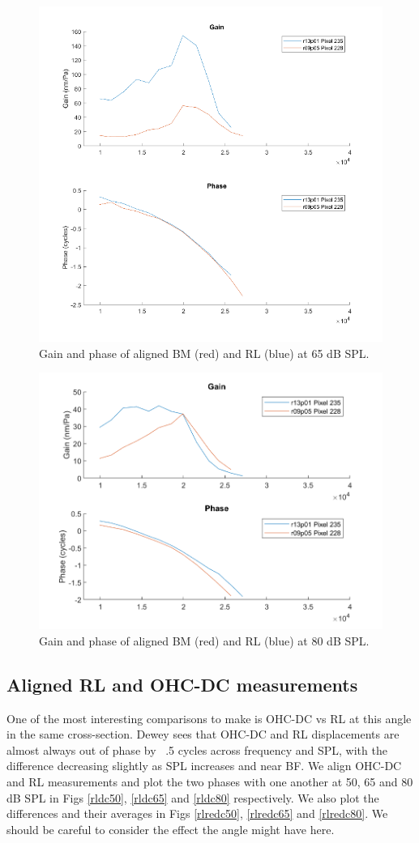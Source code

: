 \documentclass{article}
\begin{document}
\begin{figure}
	\centering
	\includegraphics[width=.7\textwidth]{Figures/rlbm65.png}
	\caption{Gain and phase of aligned BM (red) and RL (blue) at 65 dB SPL.}
	\label{rlbm65}
\end{figure}

\begin{figure}
	\centering
	\includegraphics[width=.7\textwidth]{Figures/rlbm80.png}
	\caption{Gain and phase of aligned BM (red) and RL (blue) at 80 dB SPL.}
	\label{rlbm80}
\end{figure}

\subsection{Aligned RL and OHC-DC measurements}
\par{One of the most interesting comparisons to make is OHC-DC vs RL at this angle in the same cross-section. Dewey sees that OHC-DC and RL displacements are almost always out of phase by ~.5 cycles across frequency and SPL, with the difference decreasing slightly as SPL increases and near BF. We align OHC-DC and RL measurements and plot the two phases with one another at 50, 65 and 80 dB SPL in Figs \ref{rldc50}, \ref{rldc65} and \ref{rldc80} respectively. We also plot the differences and their averages in Figs \ref{rlredc50}, \ref{rlredc65} and \ref{rlredc80}. We should be careful to consider the effect the angle might have here.}
\end{document}
